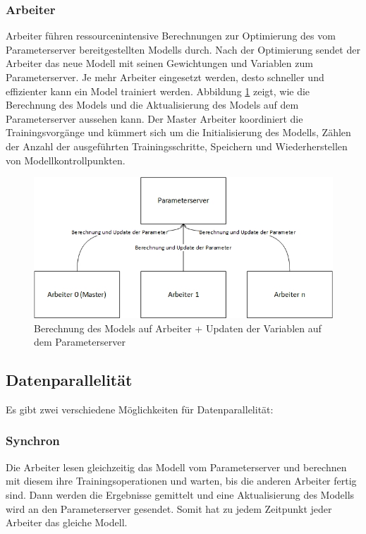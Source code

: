 \subsubsection{Arbeiter}
Arbeiter führen ressourcenintensive Berechnungen zur Optimierung des vom Parameterserver bereitgestellten Modells durch. Nach der Optimierung sendet der Arbeiter das neue Modell mit seinen Gewichtungen und Variablen zum Parameterserver. Je mehr Arbeiter eingesetzt werden, desto schneller und effizienter kann ein Model trainiert werden. Abbildung \ref{fig:architektur-updatemodel} zeigt, wie die Berechnung des Models und die Aktualisierung des Models auf dem Parameterserver aussehen kann. Der Master Arbeiter koordiniert die Trainingsvorgänge und kümmert sich um die Initialisierung des Modells, Zählen der Anzahl der ausgeführten Trainingsschritte, Speichern und Wiederherstellen von Modellkontrollpunkten.

\begin{figure}[h!]
	\centering
	\includegraphics[width=1\linewidth]{Pictures/Architektur-UpdateModel}
	\caption[Berechnung des Models auf Arbeiter + Updaten der Variablen auf dem Parameterserver]{Berechnung des Models auf Arbeiter + Updaten der Variablen auf dem Parameterserver}
	\label{fig:architektur-updatemodel}
\end{figure}

\subsection{Datenparallelität}
Es gibt zwei verschiedene Möglichkeiten für Datenparallelität:
\subsubsection{Synchron}
Die Arbeiter lesen gleichzeitig das Modell vom Parameterserver und berechnen mit diesem ihre Trainingsoperationen und warten, bis die anderen Arbeiter fertig sind. Dann werden die Ergebnisse gemittelt und eine Aktualisierung des Modells wird an den Parameterserver gesendet. Somit hat zu jedem Zeitpunkt jeder Arbeiter das gleiche Modell.

